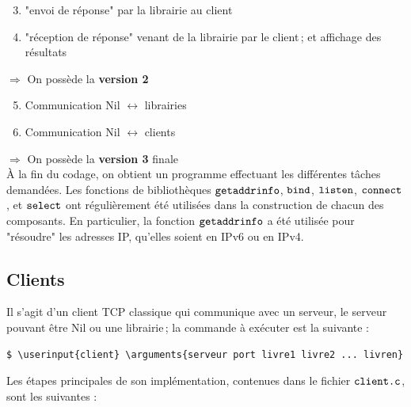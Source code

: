 \documentclass[
  french,
  twocolumn,
	9pt, %
]{fphw}
\newcommand\userinput[1]{\textbf{#1}}
\newcommand\arguments[1]{\textit{#1}}
\begin{document}
\begin{enumerate}
  \setcounter{enumi}{2}
  \item "envoi de réponse" par la librairie au client
  \item "réception de réponse" venant de la librairie par le client ; et affichage des résultats 
\end{enumerate}
$\Longrightarrow$ On possède la \textbf{version 2} 

\begin{enumerate}
  \setcounter{enumi}{4}
  \item Communication Nil $\longleftrightarrow $ librairies
  \item Communication Nil $\longleftrightarrow $ clients
\end{enumerate}
$\Longrightarrow$ On possède la \textbf{version 3} finale
\\

\noindent À la fin du codage, on obtient un programme effectuant les différentes tâches demandées. Les fonctions de bibliothèques $\verb|getaddrinfo|$, $\verb|bind|$, $\verb|listen|$, $\verb|connect|$, et $\verb|select|$ ont régulièrement été utilisées dans la construction de chacun des composants. En particulier, la fonction $\verb|getaddrinfo|$ a été utilisée pour "résoudre" les adresses IP, qu'elles soient en IPv6 ou en IPv4.


\subsection{Clients}

Il s'agit d'un client TCP classique qui communique avec un serveur, le serveur pouvant être Nil ou une librairie ; la commande à exécuter est la suivante :
\begin{Verbatim}[commandchars=\\\{\}]
$ \userinput{client} \arguments{serveur port livre1 livre2 ... livren}
\end{Verbatim}

\noindent Les étapes principales de son implémentation, contenues dans le fichier $\verb|client.c|$, sont les suivantes :
\end{document}
